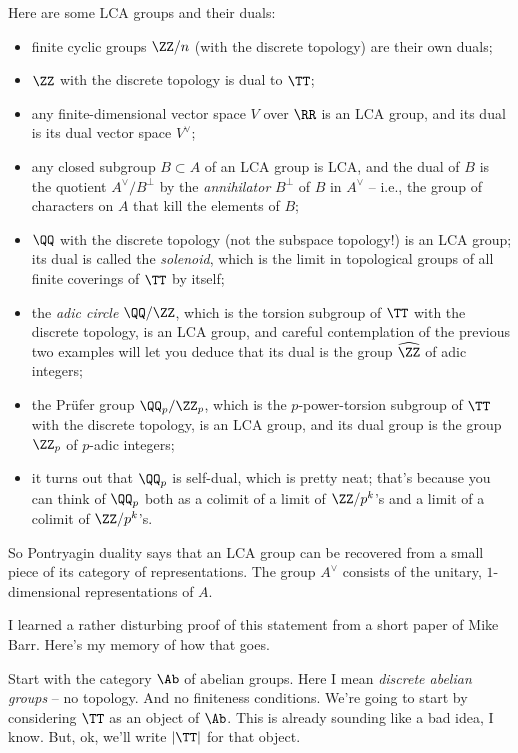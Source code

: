 \documentclass[leqno]{article}
\begin{document}
Here are some LCA groups and their duals:
\begin{itemize}
    \item finite cyclic groups \(\ZZ/n\) (with the discrete topology) are their own duals;
    \item \(\ZZ\) with the discrete topology is dual to \(\TT\);
    \item any finite-dimensional vector space \(V\) over \(\RR\)
        is an LCA group, and its dual is
        its dual vector space \(V^{\vee}\);
    \item any closed subgroup \(B \subset A\) of an LCA group is LCA,
        and the dual of \(B\) is the quotient \(A^{\vee}/B^{\perp}\)
        by the \emph{annihilator} \(B^{\perp}\) of \(B\) in
        \(A^{\vee}\) -- i.e., the group of characters on \(A\) that
        kill the elements of \(B\);
    \item \(\QQ\) with the discrete topology
        (not the subspace topology!)
        is an LCA group;
        its dual is called the \emph{solenoid},
        which is the limit in topological groups of
        all finite coverings of \(\TT\) by itself;
    \item the \emph{adic circle} \(\QQ/\ZZ\),
        which is the torsion subgroup of \(\TT\) with the discrete topology,
        is an LCA group,
        and careful contemplation of the previous two examples
        will let you deduce that its dual is the group \(\widehat{\ZZ}\) of adic integers;
    \item the Prüfer group \(\QQ_p/\ZZ_p\),
        which is the \(p\)-power-torsion subgroup of \(\TT\) with the discrete topology,
        is an LCA group,
        and its dual group is the group \(\ZZ_p\) of
        \(p\)-adic integers;
    \item it turns out that \(\QQ_p\) is self-dual,
        which is pretty neat;
        that's because you can think of \(\QQ_p\) both as
        a colimit of a limit of \(\ZZ/p^k\)'s and
        a limit of a colimit of \(\ZZ/p^k\)'s.
\end{itemize}

So Pontryagin duality says that an LCA group can be recovered from
a small piece of its category of representations.
The group \(A^{\vee}\) consists of
the unitary, \(1\)-dimensional representations of \(A\).

I learned a rather disturbing proof of this statement
from a short paper of Mike Barr.
Here's my memory of how that goes.

Start with the category \(\Ab\) of abelian groups.
Here I mean \emph{discrete abelian groups} -- no topology.
And no finiteness conditions.
We're going to start by considering \(\TT\) as an object of \(\Ab\).
This is already sounding like a bad idea, I know.
But, ok, we'll write \(|\TT|\) for that object.
\end{document}
